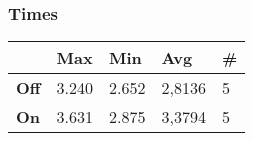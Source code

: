 \documentclass[a4paper, 10pt]{article}
\begin{document}
\begin{minipage}
\subsubsection{Times}
\begin{table}[H]
\begin{tabular}{l|l|l|l|l|}
\cline{2-5}
\textbf{}                             & \textbf{Max} & \textbf{Min} & \textbf{Avg} & \textbf{\#}  \\ \hline
\multicolumn{1}{|l|}{\textbf{Off}} & 3.240         & 2.652         & 2,8136          & 5            \\ \hline
\multicolumn{1}{|l|}{\textbf{On}}  & 3.631         & 2.875         & 3,3794          & 5            \\ \hline
\end{tabular}
\end{table}
\end{minipage}
\end{document}
